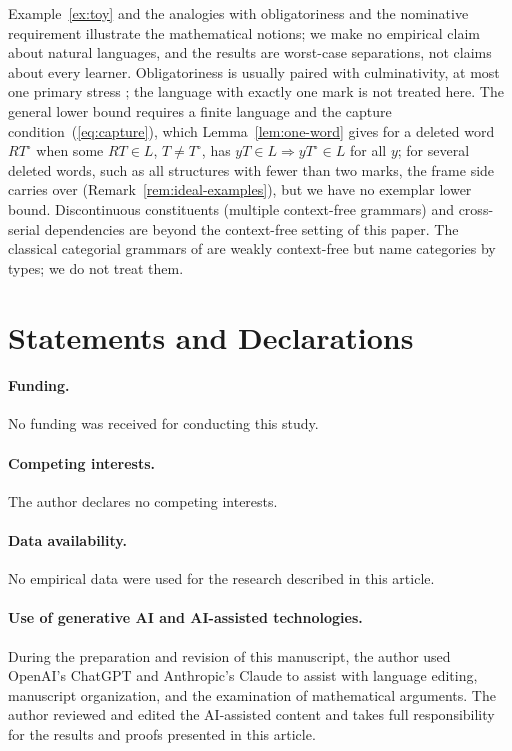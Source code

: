 \documentclass[11pt]{article}
\numberwithin{equation}{section}
\theoremstyle{plain}
\theoremstyle{definition}
\theoremstyle{remark}
\theoremstyle{plain}
\begin{document}
Example~\ref{ex:toy} and the analogies with obligatoriness and the
nominative requirement illustrate the mathematical notions; we make no
empirical claim about natural languages, and the results are worst-case
separations, not claims about every learner.  Obligatoriness is usually
paired with culminativity, at most one primary stress \citep{hyman2006};
the language with exactly one mark is not treated here.  The general lower bound
requires a finite language and the capture condition~(\ref{eq:capture}),
which Lemma~\ref{lem:one-word} gives for a deleted word $RT^\circ$ when some
$RT\in L$, $T\ne T^\circ$, has $yT\in L\Rightarrow yT^\circ\in L$ for all $y$; for
several deleted words, such as all structures with fewer than two marks, the
frame side carries over (Remark~\ref{rem:ideal-examples}), but we have no
exemplar lower bound.  Discontinuous constituents (multiple context-free
grammars) and cross-serial dependencies are beyond the context-free setting
of this paper.  The classical categorial grammars of \citet{kanazawa1998}
are weakly context-free but name categories by types; we do not treat them.

\section*{Statements and Declarations}

\paragraph{Funding.}
No funding was received for conducting this study.

\paragraph{Competing interests.}
The author declares no competing interests.

\paragraph{Data availability.}
No empirical data were used for the research described in this article.

\paragraph{Use of generative AI and AI-assisted technologies.}
During the preparation and revision of this manuscript, the author used
OpenAI's ChatGPT and Anthropic's Claude to assist with language editing,
manuscript organization, and the examination of mathematical arguments.
The author reviewed and edited the AI-assisted content and takes full
responsibility for the results and proofs presented in this article.
\end{document}
